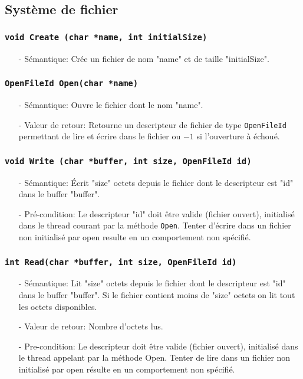 \documentclass[11pt]{article}
\theoremstyle{definition}
\begin{document}
\subsection{Système de fichier}

\subsubsection{\texttt{void Create (char *name, int initialSize)}}
\begin{itemize}
\item[-]Sémantique: Crée un fichier de nom "name" et de taille "initialSize".
\end{itemize}

\subsubsection{\texttt{OpenFileId Open(char *name)}}
\begin{itemize}
\item[-]Sémantique: Ouvre le fichier dont le nom "name". 
\item[-]Valeur de retour: Retourne un descripteur de fichier de type \texttt{OpenFileId}
  permettant de lire et écrire dans le fichier ou $-1$ si l'ouverture à échoué.
\end{itemize}

\subsubsection{\texttt{void Write (char *buffer, int size, OpenFileId id)}}
\begin{itemize}
\item[-]Sémantique: Écrit "size" octets depuis le fichier dont le descripteur est "id"
  dans le buffer "buffer".
\item[-]Pré-condition: Le descripteur "id" doit être valide (fichier ouvert), initialisé dans le thread courant
  par la méthode \texttt{Open}. Tenter d'écrire dans un fichier non initialisé par open resulte en un comportement non spécifié.
\end{itemize}

\subsubsection{\texttt{int Read(char *buffer, int size, OpenFileId id)}}
\begin{itemize}
\item[-]Sémantique: Lit "size" octets depuis le fichier dont le descripteur est "id" dans le buffer
  "buffer". Si le fichier contient moins de "size" octets on lit tout les octets disponibles.
\item[-]Valeur de retour: Nombre d'octets lus.
\item[-]Pre-condition: Le descripteur doit être valide (fichier ouvert), initialisé dans le thread appelant
  par la méthode Open.
  Tenter de lire dans un fichier non initialisé par open résulte en un comportement non spécifié.
\end{itemize}
\end{document}
